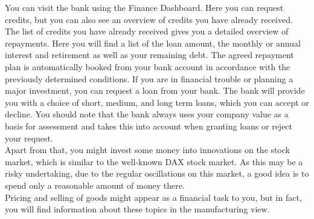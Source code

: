 You can visit the bank using the Finance Dashboard. Here you can request credits, but you can also see an overview of credits you have already received.
The list of credits you have already received gives you a detailed overview of repayments. Here you will find a list of the loan amount, the monthly or annual interest and retirement as well as your remaining debt. The agreed repayment plan is automatically booked from your bank account in accordance with the previously determined conditions.
If you are in financial trouble or planning a major investment, you can request a loan from your bank. The bank will provide you with a choice of short, medium, and long term loans, which you can accept or decline. You should note that the bank always uses your company value as a basis for assessment and takes this into account when granting loans or reject your request. \\

Apart from that, you might invest some money into innovations on the stock market, which is similar to the well-known DAX stock market. As this may be a risky undertaking, due to the regular oscillations on this market, a good idea is to spend only a reasonable amount of money there. \\

Pricing and selling of goods might appear as a financial task to you, but in fact, you will find information about these topics in the manufacturing view.\\ 


